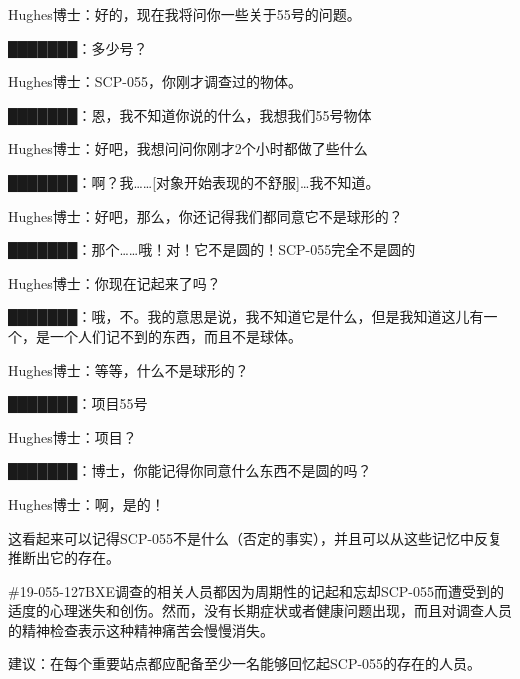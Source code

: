 \begin{scpbox}

Hughes博士：好的，现在我将问你一些关于55号的问题。

███████：多少号？

Hughes博士：SCP-055，你刚才调查过的物体。

███████：恩，我不知道你说的什么，我想我们55号物体

Hughes博士：好吧，我想问问你刚才2个小时都做了些什么

███████：啊？我……{[}对象开始表现的不舒服]…我不知道。

Hughes博士：好吧，那么，你还记得我们都同意它不是球形的？

███████：那个……哦！对！它不是圆的！SCP-055完全不是圆的

Hughes博士：你现在记起来了吗？

███████：哦，不。我的意思是说，我不知道它是什么，但是我知道这儿有一个，是一个人们记不到的东西，而且不是球体。

Hughes博士：等等，什么不是球形的？

███████：项目55号

Hughes博士：项目？

███████：博士，你能记得你同意什么东西不是圆的吗？

Hughes博士：啊，是的！

\end{scpbox}

这看起来可以记得SCP-055不是什么（否定的事实），并且可以从这些记忆中反复推断出它的存在。

\#19-055-127BXE调查的相关人员都因为周期性的记起和忘却SCP-055而遭受到的适度的心理迷失和创伤。然而，没有长期症状或者健康问题出现，而且对调查人员的精神检查表示这种精神痛苦会慢慢消失。

建议：在每个重要站点都应配备至少一名能够回忆起SCP-055的存在的人员。
